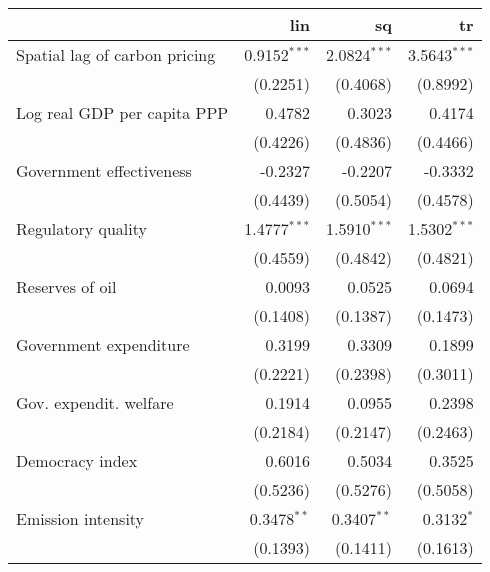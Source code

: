 \begin{tabular}{lrrr}
\toprule
{} &               lin &                 sq &                tr \\
\midrule
Spatial lag of carbon pricing      &  0.9152$^{* * *}$ &   2.0824$^{* * *}$ &  3.5643$^{* * *}$ \\
                                   &          (0.2251) &           (0.4068) &          (0.8992) \\
Log real GDP per capita PPP        &            0.4782 &             0.3023 &            0.4174 \\
                                   &          (0.4226) &           (0.4836) &          (0.4466) \\
Government effectiveness           &           -0.2327 &            -0.2207 &           -0.3332 \\
                                   &          (0.4439) &           (0.5054) &          (0.4578) \\
Regulatory quality                 &  1.4777$^{* * *}$ &   1.5910$^{* * *}$ &  1.5302$^{* * *}$ \\
                                   &          (0.4559) &           (0.4842) &          (0.4821) \\
Reserves of oil                    &            0.0093 &             0.0525 &            0.0694 \\
                                   &          (0.1408) &           (0.1387) &          (0.1473) \\
Government expenditure             &            0.3199 &             0.3309 &            0.1899 \\
                                   &          (0.2221) &           (0.2398) &          (0.3011) \\
Gov. expendit. welfare             &            0.1914 &             0.0955 &            0.2398 \\
                                   &          (0.2184) &           (0.2147) &          (0.2463) \\
Democracy index                    &            0.6016 &             0.5034 &            0.3525 \\
                                   &          (0.5236) &           (0.5276) &          (0.5058) \\
Emission intensity                 &    0.3478$^{* *}$ &     0.3407$^{* *}$ &      0.3132$^{*}$ \\
                                   &          (0.1393) &           (0.1411) &          (0.1613) \\

\end{tabular}
